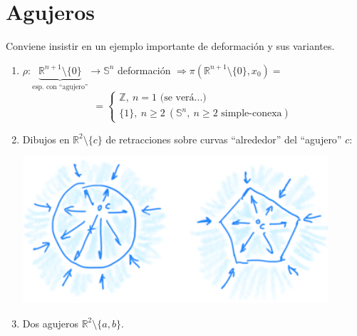 \documentclass[10pt,a4paper,openright]{book}
\theoremstyle{break}
\begin{document}
\section{Agujeros}%
\label{sec:agujeros}
Conviene insistir en un ejemplo importante de deformación y sus variantes.
\begin{enumerate}
    \item $\rho: \underbrace{\mathbb{R}^{n + 1} \setminus \{0\}}_{\text{esp. con ``agujero''}}  \rightarrow \mathbb{S}^n$ deformación $\Rightarrow \pi\left( \mathbb{R}^{n + 1} \setminus \{0\}, x_0 \right) =$ \[
    = \begin{cases}
        \mathbb{Z},\ n = 1 \text{ (se verá...)}\\
        \{1\},\ n \ge 2\ (\mathbb{S}^n,\ n \ge 2 \text{ simple-conexa}) 
    \end{cases} 
    \]

    \item Dibujos en $\mathbb{R}^2 \setminus \{c\}$ de retracciones sobre curvas ``alrededor'' del ``agujero'' $c$:
    \begin{center}
        \includegraphics[scale=0.3]{images/curvas_R2_agujero_c} 
    \end{center}

    \item Dos agujeros $\mathbb{R}^2 \setminus \{a, b\}$.


\end{enumerate}
\end{document}
